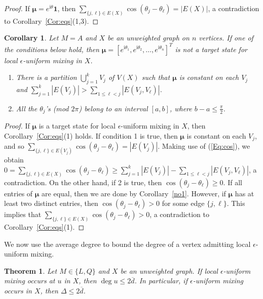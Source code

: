 \documentclass[11pt]{article}
\newtheorem{theorem}{Theorem}
\newtheorem{corollary}{Corollary}
\newcommand{\bmu}{{\boldsymbol{\mu}}}
\newcommand{\one}{\mathbf 1}
\def\ii{\mathrm{i}}
\begin{document}
\begin{proof}
If $\bmu=e^{\ii\theta}\one$, then $\sum_{\{j,\ell\}\in E(X)}\cos(\theta_j-\theta_{\ell})=|E(X)|$, a contradiction to Corollary~\ref{Cor:eqs}(1,3).
\end{proof}

\begin{corollary}
\label{edgexp1}
Let $M=A$ and $X$ be an unweighted graph on $n$ vertices. If one of the conditions below hold, then $\bmu=[e^{\ii \theta_1},e^{\ii \theta_2},\ldots,e^{\ii \theta_{n}}]^T$ is not a target state for local $\epsilon$-uniform mixing in $X$.
\begin{enumerate}
\item There is a partition $\bigcup_{j=1}^k V_j$ of $V(X)$ such that $\bmu$ is constant on each $V_j$ and $\sum_{j=1}^k|E(V_j)|>
\sum_{1\leq \ell<j}|E(V_j,V_\ell)|$.
\item All the $\theta_j$'s (mod $2\pi$) belong to an interval $[a,b]$, where $b-a\leq \frac{\pi}{2}$.
\end{enumerate}
\end{corollary}

\begin{proof}
If $\bmu$ is a target state for local $\epsilon$-uniform mixing in $X$, then Corollary~\ref{Cor:eqs}(1) holds. If condition 1 is true, then $\bmu$ is constant on each $V_j$, and so $\sum_{\{j,\ell\}\in E(V_j)}\cos(\theta_j-\theta_{\ell})=|E(V_j)|$. Making use of (\ref{Eq:cos}), we obtain $0=\sum_{\{j,\ell\}\in E(X)}\cos(\theta_j-\theta_{\ell})\geq  \sum_{j=1}^k|E(V_j)|-
\sum_{1\leq \ell<j}|E(V_j,V_\ell)|$,
a contradiction. On the other hand, if 2 is true, then $\cos(\theta_j-\theta_{\ell})\geq 0$. If all entries of $\bmu$ are equal, then we are done by Corollary~\ref{no1}. However, if $\bmu$ has at least two distinct entries, then $\cos(\theta_j-\theta_{\ell})>0$ for some edge $\{j,\ell\}$. This implies that $\sum_{\{j,\ell\}\in E(X)}\cos(\theta_j-\theta_{\ell})>0$, a contradiction to Corollary~\ref{Cor:eqs}(1).
\end{proof}

We now use the average degree to bound the degree of a vertex admitting local $\epsilon$-uniform mixing.

\begin{theorem}
\label{Cor:avedeg}
Let $M\in\{L,Q\}$ and $X$ be an unweighted graph. If local $\epsilon$-uniform mixing occurs at $u$ in $X$, then $\operatorname{deg}u\leq 2\overline{d}$. In particular, if $\epsilon$-uniform mixing occurs in $X$, then $\Delta\leq 2\overline{d}$.
\end{theorem}
\end{document}
